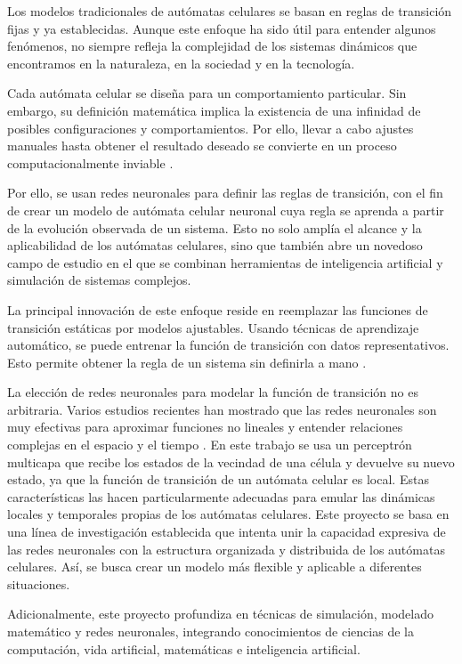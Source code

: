 Los modelos tradicionales de autómatas celulares se basan en reglas de transición fijas y ya establecidas. Aunque este enfoque ha sido útil para entender algunos fenómenos, no siempre refleja la complejidad de los sistemas dinámicos que encontramos en la naturaleza, en la sociedad y en la tecnología. 

Cada autómata celular se diseña para un comportamiento particular. Sin embargo, su definición matemática implica la existencia de una infinidad de posibles configuraciones y comportamientos. Por ello, llevar a cabo ajustes manuales hasta obtener el resultado deseado se convierte en un proceso computacionalmente inviable \cite{elYacoubi2021control}. 

Por ello, se usan redes neuronales para definir las reglas de transición, con el fin de crear un modelo de autómata celular neuronal cuya regla se aprenda a partir de la evolución observada de un sistema. Esto no solo amplía el alcance y la aplicabilidad de los autómatas celulares, sino que también abre un novedoso campo de estudio en el que se combinan herramientas de inteligencia artificial y simulación de sistemas complejos. 

La principal innovación de este enfoque reside en reemplazar las funciones de transición estáticas por modelos ajustables. Usando técnicas de aprendizaje automático, se puede entrenar la función de transición con datos representativos. Esto permite obtener la regla de un sistema sin definirla a mano \cite{gilpin2019_nca}. 

La elección de redes neuronales para modelar la función de transición no es arbitraria. Varios estudios recientes han mostrado que las redes neuronales son muy efectivas para aproximar funciones no lineales y entender relaciones complejas en el espacio y el tiempo \cite{mordvintsev2020_nca}. En este trabajo se usa un perceptrón multicapa que recibe los estados de la vecindad de una célula y devuelve su nuevo estado, ya que la función de transición de un autómata celular es local. Estas características las hacen particularmente adecuadas para emular las dinámicas locales y temporales propias de los autómatas celulares. Este proyecto se basa en una línea de investigación establecida que intenta unir la capacidad expresiva de las redes neuronales con la estructura organizada y distribuida de los autómatas celulares. Así, se busca crear un modelo más flexible y aplicable a diferentes situaciones.

Adicionalmente, este proyecto profundiza en técnicas de simulación, modelado matemático y redes neuronales, integrando conocimientos de ciencias de la computación, vida artificial, matemáticas e inteligencia artificial.

